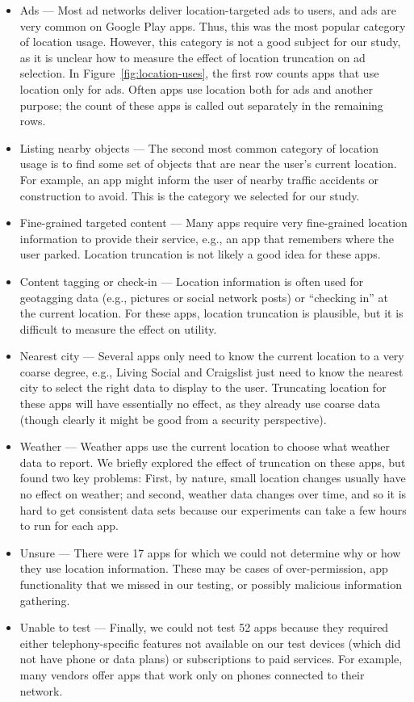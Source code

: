 \begin{itemize}
\item Ads --- Most ad networks deliver location-targeted ads to
  users, and ads are very common on Google Play apps. Thus, this was
  the most popular category of location usage. However, this
  category is not a good subject for our study, as it is
  unclear how to measure the effect of location truncation on ad
  selection. In Figure~\ref{fig:location-uses}, the first row counts
  apps that use location only for ads. Often apps use location both
  for ads and another purpose; the count of these apps is called out
  separately in the remaining rows.
\item Listing nearby objects --- The second most common category of
  location usage is to find some set of objects that are near the
  user's current location. For example, an app might inform the user of
  nearby traffic accidents or construction to avoid. This is the
  category we selected for our study.
\item Fine-grained targeted content --- Many apps require
  very fine-grained location information to provide their service,
  e.g., an app that remembers where the user parked.
  Location truncation is not likely a good idea for these apps.
\item Content tagging or check-in --- Location information is often
  used for geotagging data (e.g., pictures
  or social network posts) or ``checking in'' at the current
  location. For these apps, location truncation is plausible, but
  it is difficult to measure the effect on utility.
\item Nearest city --- Several apps only need to know the current
  location to a very coarse degree, e.g., Living Social and
  Craigslist just need to know the nearest city to select the right
  data to display to the user. Truncating location for these apps
  will have essentially no effect, as they already use coarse data
  (though clearly it might be good from a security perspective).
\item Weather --- Weather apps use the current location to choose
  what weather data to report. We briefly explored the effect of
  truncation on these apps, but found two key problems: First, by
  nature, small
  location changes usually have no effect on weather; and second, weather data changes
  over time, and so it is hard to get consistent data sets because
  our experiments can take a few hours
  to run for each app.
\item Unsure --- There were 17 apps for which we could not determine
  why or how they use location information. These may be cases of
  over-permission, app functionality that we missed in our testing,
  or possibly malicious information gathering.
\item Unable to test --- Finally, we could not test 52 apps because
  they required either telephony-specific features not available on
  our test devices (which did not have phone or data plans) or
  subscriptions to paid services.  For example, many vendors offer
  apps that work only on phones connected to their network.
\end{itemize}

